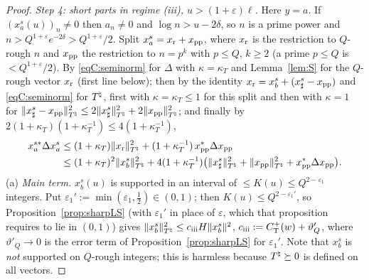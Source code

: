 \begin{proof}
\emph{Step 4: short parts in regime (iii), $u>(1+\varepsilon)\ell$.} Here $y=a$. If $(x_a^s(u))_n\ne0$ then $a_n\ne0$ and
$\log n>u-2\delta$, so $n$ is a prime power and $n>Q^{1+\varepsilon}e^{-2\delta}>Q^{1+\varepsilon}/2$. Split
$x_a^s=x_{\rm r}+x_{\rm pp}$, where $x_{\rm r}$ is the restriction to $Q$-rough $n$ and $x_{\rm pp}$ the restriction to $n=p^k$ with $p\le Q$, $k\ge2$ (a
prime $p\le Q$ is $<Q^{1+\varepsilon}/2$). By \eqref{eqC:seminorm} for $\Delta$ with $\kappa=\kappa_T$ and Lemma~\ref{lem:S} for the $Q$-rough
vector $x_{\rm r}$ (first line below); then by the identity $x_{\rm r}=x_b^s+(x_\sharp^s-x_{\rm pp})$ and \eqref{eqC:seminorm} for $T^\natural$, first with
$\kappa=\kappa_T\le1$ for this split and then with $\kappa=1$ for $\|x_\sharp^s-x_{\rm pp}\|^2_{T^\natural}\le2\|x_\sharp^s\|^2_{T^\natural}+2\|x_{\rm pp}\|^2_{T^\natural}$;
and finally by $2(1+\kappa_T)(1+\kappa_T^{-1})\le4(1+\kappa_T^{-1})$,
\begin{align*}
 x_a^{s*}\Delta x_a^s&\le(1+\kappa_T)\|x_{\rm r}\|^2_{T^\natural}+(1+\kappa_T^{-1})\,x_{\rm pp}^*\Delta x_{\rm pp}\\
 &\le(1+\kappa_T)^2\|x_b^s\|^2_{T^\natural}+4(1+\kappa_T^{-1})\big(\|x_\sharp^s\|^2_{T^\natural}+\|x_{\rm pp}\|^2_{T^\natural}+x_{\rm pp}^*\Delta x_{\rm pp}\big).
\end{align*}
(a) \emph{Main term.} $x_b^s(u)$ is supported in an interval of $\le K(u)\le Q^{2-\varepsilon_1}$ integers. Put $\varepsilon_1':=\min(\varepsilon_1,\frac12)\in(0,1)$;
then $K(u)\le Q^{2-\varepsilon_1'}$, so Proposition~\ref{prop:sharpLS} (with $\varepsilon_1'$ in place of $\varepsilon$, which that proposition requires to lie in $(0,1)$)
gives $\|x_b^s\|^2_{T^\natural}\le c_{\rm iii}H\|x_b^s\|^2$, $c_{\rm iii}:=C^{+}_{\mathrm T}(w)+\vartheta'_Q$, where $\vartheta'_Q\to0$ is the error term of Proposition~\ref{prop:sharpLS} for $\varepsilon_1'$. Note that $x_b^s$ is
\emph{not} supported on $Q$-rough integers; this is harmless because $T^\natural\succeq0$ is defined on all vectors.


\end{proof}
